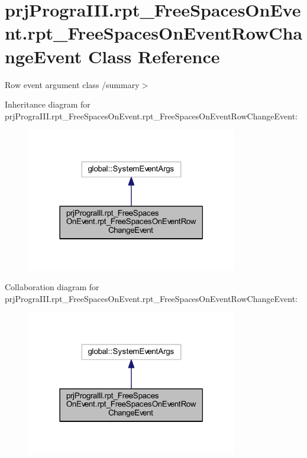 \hypertarget{classprj_progra_i_i_i_1_1rpt___free_spaces_on_event_1_1rpt___free_spaces_on_event_row_change_event}{}\section{prj\+Progra\+I\+I\+I.\+rpt\+\_\+\+Free\+Spaces\+On\+Event.\+rpt\+\_\+\+Free\+Spaces\+On\+Event\+Row\+Change\+Event Class Reference}
\label{classprj_progra_i_i_i_1_1rpt___free_spaces_on_event_1_1rpt___free_spaces_on_event_row_change_event}


Row event argument class /summary$>$  




Inheritance diagram for prj\+Progra\+I\+I\+I.\+rpt\+\_\+\+Free\+Spaces\+On\+Event.\+rpt\+\_\+\+Free\+Spaces\+On\+Event\+Row\+Change\+Event\+:
\nopagebreak
\begin{figure}[H]
\begin{center}
\leavevmode
\includegraphics[width=261pt]{classprj_progra_i_i_i_1_1rpt___free_spaces_on_event_1_1rpt___free_spaces_on_event_row_change_event__inherit__graph}
\end{center}
\end{figure}


Collaboration diagram for prj\+Progra\+I\+I\+I.\+rpt\+\_\+\+Free\+Spaces\+On\+Event.\+rpt\+\_\+\+Free\+Spaces\+On\+Event\+Row\+Change\+Event\+:
\nopagebreak
\begin{figure}[H]
\begin{center}
\leavevmode
\includegraphics[width=261pt]{classprj_progra_i_i_i_1_1rpt___free_spaces_on_event_1_1rpt___free_spaces_on_event_row_change_event__coll__graph}
\end{center}
\end{figure}
